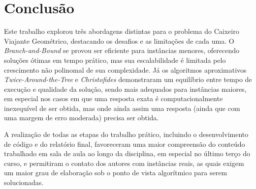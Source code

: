 \documentclass[12pt]{article}
\begin{document}
\section{Conclusão}
Este trabalho explorou três abordagens distintas para o problema do Caixeiro Viajante Geométrico, destacando os desafios e as limitações de cada uma. O \textit{Branch-and-Bound} se provou ser eficiente para instâncias menores, oferecendo soluções ótimas em tempo prático, mas sua escalabilidade é limitada pelo crescimento não polinomal de sua complexidade. Já os algoritmos aproximativos \textit{Twice-Around-the-Tree} e \textit{Christofides} demonstraram um equilíbrio entre tempo de execução e qualidade da solução, sendo mais adequados para instâncias maiores, em especial nos casos em que uma resposta exata é computacionalmente inexequível de ser obtida, mas onde ainda assim uma resposta (ainda que com uma margem de erro moderada) precisa ser obtida.

A realização de todas as etapas do trabalho prático, incluindo o desenvolvimento de código e do relatório final, favoreceram uma maior compreensão do conteúdo trabalhado em sala de aula ao longo da disciplina, em especial no último terço do curso, e permitiram o contato dos autores com instâncias reais, as quais exigem um maior grau de elaboração sob o ponto de vista algorítmico para serem solucionadas. 

\newpage


\end{document}
